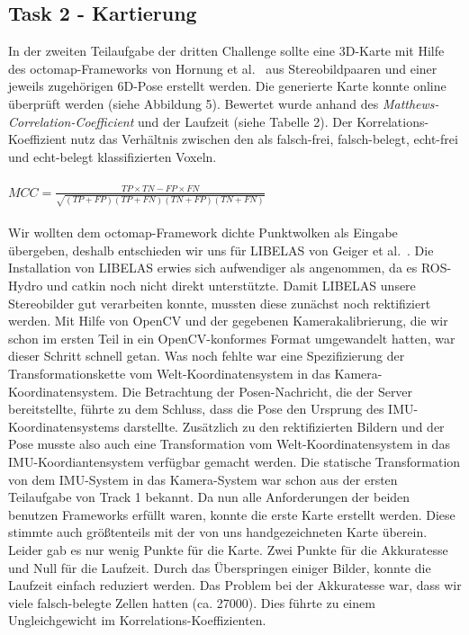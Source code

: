 \documentclass[12pt,titlepage, a4paper]{article}
\begin{document}
\FloatBarrier
			
\subsection{Task 2 - Kartierung}
In der zweiten Teilaufgabe der dritten Challenge sollte eine 3D-Karte mit Hilfe des octomap-Frameworks von Hornung et al.~\cite{hornung13auro} aus Stereobildpaaren und einer jeweils zugehörigen 6D-Pose erstellt werden. Die generierte Karte konnte online überprüft werden (siehe Abbildung 5). Bewertet wurde anhand des \textit{Matthews-Correlation-Coefficient} und der Laufzeit (siehe Tabelle 2). Der Korrelations-Koeffizient nutz das Verhältnis zwischen den als falsch-frei, falsch-belegt, echt-frei und echt-belegt klassifizierten Voxeln.\\\\
$MCC = \frac{TP \times TN - FP \times FN}{\sqrt{(TP+FP)(TP+FN)(TN+FP)(TN+FN)}}$\\\\
Wir wollten dem octomap-Framework dichte Punktwolken als Eingabe übergeben, deshalb entschieden wir uns für LIBELAS von Geiger et al.~\cite{Geiger2010ACCV}. Die Installation von LIBELAS erwies sich aufwendiger als angenommen, da es ROS-Hydro und catkin noch nicht direkt unterstützte. Damit LIBELAS unsere Stereobilder gut verarbeiten konnte, mussten diese zunächst noch rektifiziert werden. Mit Hilfe von OpenCV und der gegebenen Kamerakalibrierung, die wir schon im ersten Teil in ein OpenCV-konformes Format umgewandelt hatten, war dieser Schritt schnell getan. Was noch fehlte war eine Spezifizierung der Transformationskette vom Welt-Koordinatensystem in das Kamera-Koordinatensystem. Die Betrachtung der Posen-Nachricht, die der Server bereitstellte, führte zu dem Schluss, dass die Pose den Ursprung des IMU-Koordinatensystems darstellte. Zusätzlich zu den rektifizierten Bildern und der Pose musste also auch eine Transformation vom Welt-Koordinatensystem in das IMU-Koordiantensystem verfügbar gemacht werden. Die 
statische Transformation von dem IMU-System in das Kamera-System war schon aus der ersten Teilaufgabe von Track 1 bekannt. Da nun alle Anforderungen der beiden benutzen Frameworks erfüllt waren, konnte die erste Karte erstellt werden. Diese stimmte auch größtenteils mit der von uns handgezeichneten Karte überein. Leider gab es nur wenig Punkte für die Karte. Zwei Punkte für die Akkuratesse und Null für die Laufzeit. Durch das Überspringen einiger Bilder, konnte die Laufzeit einfach reduziert werden. Das Problem bei der Akkuratesse war, dass wir viele falsch-belegte Zellen hatten (ca. 27000). Dies führte zu einem Ungleichgewicht im Korrelations-Koeffizienten. 
\end{document}
